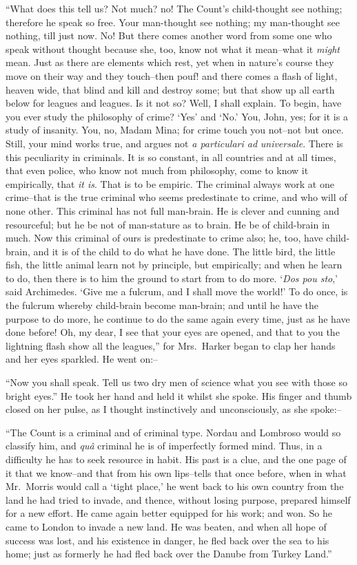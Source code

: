 \documentclass[12pt,openright]{book}
\begin{document}
“What does this tell us? Not much? no! The Count’s child-thought see nothing; therefore he speak so free. Your man-thought see nothing; my man-thought see nothing, till just now. No! But there comes another word from some one who speak without thought because she, too, know not what it mean–what it \textit{might} mean. Just as there are elements which rest, yet when in nature’s course they move on their way and they touch–then pouf! and there comes a flash of light, heaven wide, that blind and kill and destroy some; but that show up all earth below for leagues and leagues. Is it not so? Well, I shall explain. To begin, have you ever study the philosophy of crime? ‘Yes’ and ‘No.’ You, John, yes; for it is a study of insanity. You, no, Madam Mina; for crime touch you not–not but once. Still, your mind works true, and argues not \textit{a particulari ad}\textit{ }\textit{universale}. There is this peculiarity in criminals. It is so constant, in all countries and at all times, that even police, who know not much from philosophy, come to know it empirically, that \textit{it is}. That is to be empiric. The criminal always work at one crime–that is the true criminal who seems predestinate to crime, and who will of none other. This criminal has not full man-brain. He is clever and cunning and resourceful; but he be not of man-stature as to brain. He be of child-brain in much. Now this criminal of ours is predestinate to crime also; he, too, have child-brain, and it is of the child to do what he have done. The little bird, the little fish, the little animal learn not by principle, but empirically; and when he learn to do, then there is to him the ground to start from to do more. ‘\textit{Dos pou sto},’ said Archimedes. ‘Give me a fulcrum, and I shall move the world!’ To do once, is the fulcrum whereby child-brain become man-brain; and until he have the purpose to do more, he continue to do the same again every time, just as he have done before! Oh, my dear, I see that your eyes are opened, and that to you the lightning flash show all the leagues,” for Mrs. Harker began to clap her hands and her eyes sparkled. He went on:–

“Now you shall speak. Tell us two dry men of science what you see with those so bright eyes.” He took her hand and held it whilst she spoke. His finger and thumb closed on her pulse, as I thought instinctively and unconsciously, as she spoke:–

“The Count is a criminal and of criminal type. Nordau and Lombroso would so classify him, and \textit{quâ} criminal he is of imperfectly formed mind. Thus, in a difficulty he has to seek resource in habit. His past is a clue, and the one page of it that we know–and that from his own lips–tells that once before, when in what Mr. Morris would call a ‘tight place,’ he went back to his own country from the land he had tried to invade, and thence, without losing purpose, prepared himself for a new effort. He came again better equipped for his work; and won. So he came to London to invade a new land. He was beaten, and when all hope of success was lost, and his existence in danger, he fled back over the sea to his home; just as formerly he had fled back over the Danube from Turkey Land.”
\end{document}
